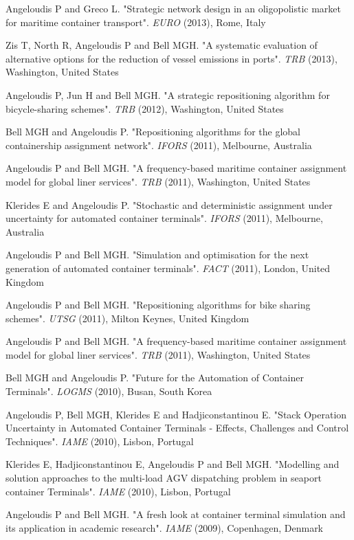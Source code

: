 \documentclass[margin]{res}
\begin{document}
\begin{resume}
\begin{etaremune}
	{Angeloudis P and Greco L}. "{Strategic network design in an oligopolistic market for maritime container transport}". \textit{EURO} (2013), Rome, Italy
	\item
	{Zis T, North R, Angeloudis P and Bell MGH}. "{A systematic evaluation of alternative options for the reduction of vessel emissions in ports}". \textit{TRB} (2013), Washington, United States
	\item
	{Angeloudis P, Jun H and Bell MGH}. "{A strategic repositioning algorithm for bicycle-sharing schemes}". \textit{TRB} (2012), Washington, United States
	\item
	{Bell MGH and Angeloudis P}. "{Repositioning algorithms for the global containership assignment network}". \textit{IFORS} (2011), Melbourne, Australia
	\item
	{Angeloudis P and Bell MGH}. "{A frequency-based maritime container assignment model for global liner services}". \textit{TRB} (2011), Washington, United States
	\item
	{Klerides E and Angeloudis P}. "{Stochastic and deterministic assignment under uncertainty for automated container terminals}". \textit{IFORS} (2011), Melbourne, Australia
	\item
	{Angeloudis P and Bell MGH}. "{Simulation and optimisation for the next generation of automated container terminals}". \textit{FACT} (2011), London, United Kingdom
	\item
	{Angeloudis P and Bell MGH}. "{Repositioning algorithms for bike sharing schemes}". \textit{UTSG} (2011), Milton Keynes, United Kingdom
	\item
	{Angeloudis P and Bell MGH}. "{A frequency-based maritime container assignment model for global liner services}". \textit{TRB} (2011), Washington, United States
	\item
	{Bell MGH and Angeloudis P}. "{Future for the Automation of Container Terminals}". \textit{LOGMS} (2010), Busan, South Korea
	\item
	{Angeloudis P, Bell MGH, Klerides E and Hadjiconstantinou E}. "{Stack Operation Uncertainty in Automated Container Terminals - Effects, Challenges and Control Techniques}". \textit{IAME} (2010), Lisbon, Portugal
	\item
	{Klerides E, Hadjiconstantinou E, Angeloudis P and Bell MGH}. "{Modelling and solution approaches to the multi-load AGV dispatching problem in seaport container Terminals}". \textit{IAME} (2010), Lisbon, Portugal
	\item
	{Angeloudis P and Bell MGH}. "{A fresh look at container terminal simulation and its application in academic research}". \textit{IAME} (2009), Copenhagen, Denmark

\end{etaremune}
\end{resume}
\end{document}
